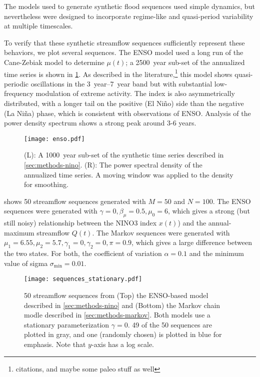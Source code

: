 \documentclass[12pt]{article}
\begin{document}
The models used to generate synthetic flood sequences used simple dynamics, but nevertheless were designed to incorporate regime-like and quasi-period variability at multiple timescales.

To verify that these synthetic streamflow sequences sufficiently represent these behaviors, we plot several sequences.
The ENSO model used a long run of the Cane-Zebiak model \citep{Zebiak1987,Ramesh2017} to determine \(\mu(t)\); a \SI{2500}{year} sub-set of the annualized time series is shown in \cref{fig:enso-ts}.
As described in the literature,\footnote{citations, and maybe some paleo stuff as well} this model shows quasi-periodic oscillations in the \SIrange{3}{7}{year} band but with substantial low-frequency modulation of extreme activity.
The index is also asymmetrically distributed, with a longer tail on the positive (El Ni\~{n}o) side than the negative (La Ni\~{n}a) phase, which is consistent with observations of ENSO.
Analysis of the power density spectrum shows a strong peak around 3-6 years.
\begin{figure}
  \texttt{[image: enso.pdf]}
  \caption{
    (L): A \SI{1000}{year} sub-set of the synthetic time series described in \cref{sec:methods-nino}.
    (R): The power spectral density of the annualized time series. A moving window was applied to the density for smoothing.\label{fig:enso-ts}
  }
\end{figure}

 shows 50 streamflow sequences generated with \(M=50\) and \(N=100\).
The ENSO sequences were generated with \(\gamma=0, \beta_\mu=0.5, \mu_0=6\), which gives a strong (but still noisy) relationship between the NINO3 index \(x(t)\)) and the annual-maximum streamflow \(Q(t)\).
The Markov sequences were generated with \(\mu_1 = 6.55, \mu_2=5.7, \gamma_1=0, \gamma_2=0, \pi=0.9\), which gives a large difference between the two states.
For both, the coefficient of variation \(\alpha=0.1\) and the minimum value of sigma \(\sigma_\text{min}=0.01\).
\begin{figure}[b]
  \texttt{[image: sequences\_stationary.pdf]}  
  \caption{
    50 streamflow sequences from (Top) the ENSO-based model described in \cref{sec:methods-nino} and (Bottom) the Markov chain modle described in \cref{sec:methods-markov}.
    Both models use a stationary parameterization \(\gamma=0\).
    49 of the 50 sequences are plotted in gray, and one (randomly chosen) is plotted in blue for emphasis.
    Note that $y$-axis has a log scale.\label{fig:stationary-sequences}
  }
\end{figure}
\end{document}
